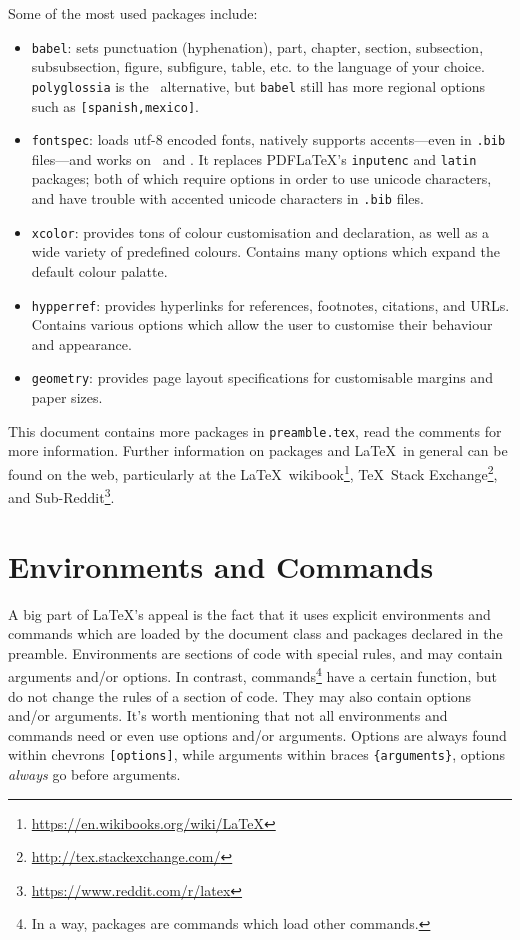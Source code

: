 Some of the most used packages include:
\begin{itemize}
    \item \verb|babel|: sets punctuation (hyphenation), part, chapter, section, subsection, subsubsection, figure, subfigure, table, etc. to the language of your choice. \verb|polyglossia| is the \XeLaTeX~alternative, but \verb|babel| still has more regional options such as \verb|[spanish,mexico]|.
    \item \verb|fontspec|: loads utf-8 encoded fonts, natively supports accents---even in \texttt{.bib} files---and works on \XeLaTeX~and \LuaTeX. It replaces PDF\LaTeX's \verb|inputenc| and \verb|latin| packages; both of which require options in order to use unicode characters, and have trouble with accented unicode characters in \texttt{.bib} files.
    \item \verb|xcolor|: provides tons of colour customisation and declaration, as well as a wide variety of predefined colours. Contains many options which expand the default colour palatte.
    \item \verb|hypperref|: provides hyperlinks for references, footnotes, citations, and URLs. Contains various options which allow the user to customise their behaviour and appearance.
    \item \verb|geometry|: provides page layout specifications for customisable margins and paper sizes. 
\end{itemize}
This document contains more packages in \texttt{preamble.tex}, read the comments for more information. Further information on packages and \LaTeX~in general can be found on the web, particularly at the \LaTeX~wikibook\footnote{\url{https://en.wikibooks.org/wiki/LaTeX}}, \TeX~Stack Exchange\footnote{\url{http://tex.stackexchange.com/}}, and Sub-Reddit\footnote{\url{https://www.reddit.com/r/latex}}.
%
\section{Environments and Commands}\label{s:ec}
%
A big part of \LaTeX's appeal is the fact that it uses explicit environments and commands which are loaded by the document class and packages declared in the preamble. Environments are sections of code with special rules, and may contain arguments and/or options. In contrast, commands\footnote{In a way, packages are commands which load other commands.} have a certain function, but do not change the rules of a section of code. They may also contain options and/or arguments. It's worth mentioning that not all environments and commands need or even use options and/or arguments. Options are always found within chevrons \verb|[options]|, while arguments within braces \verb|{arguments}|, options \emph{always} go before arguments.

